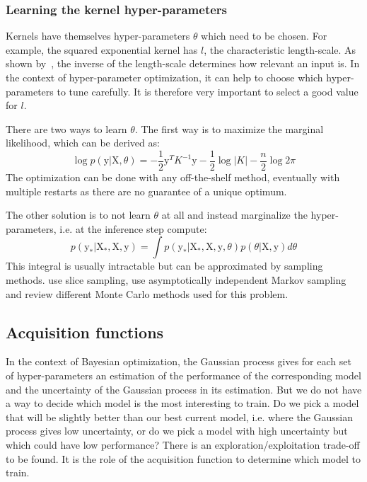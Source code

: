 \subsubsection{Learning the kernel hyper-parameters}

Kernels have themselves hyper-parameters $\theta$ which need to be chosen. For example, the squared exponential kernel has $l$, the characteristic length-scale. As shown by~\textcite{neal1996phd}, the inverse of the length-scale determines how relevant an input is. In the context of hyper-parameter optimization, it can help to choose which hyper-parameters to tune carefully. It is therefore very important to select a good value for $l$. 

There are two ways to learn $\theta$. The first way is to maximize the marginal likelihood, which can be derived as:  
\begin{equation}
	\log p\left(\mathrm{y} | \mathrm{X}, \theta \right) = - \frac{1}{2} \mathrm{y}^T K^{-1} \mathrm{y} - \frac{1}{2} \log |K| - \frac{n}{2} \log 2 \pi
\end{equation}
The optimization can be done with any off-the-shelf method, eventually with multiple restarts as there are no guarantee of a unique optimum. 

The other solution is to not learn $\theta$ at all and instead marginalize the hyper-parameters, i.e. at the inference step compute:
\begin{equation}
    p\left( \mathrm{y_*} | \mathrm{X_*}, \mathrm{X}, \mathrm{y} \right)
    = \int p\left( \mathrm{y_*} | \mathrm{X_*}, \mathrm{X}, \mathrm{y}, \theta \right) p \left( \theta | \mathrm{X}, \mathrm{y} \right) d\theta
\end{equation}
This integral is usually intractable but can be approximated by sampling methods. \textcite{murray2010NIPS} use slice sampling, \textcite{garbuno2016CSDA} use asymptotically independent Markov sampling and \textcite{titsias2011} review different Monte Carlo methods used for this problem.

\subsection{Acquisition functions}
\label{ssec:acqfunc}

In the context of Bayesian optimization, the Gaussian process gives for each set of hyper-parameters an estimation of the performance of the corresponding model and the uncertainty of the Gaussian process in its estimation. But we do not have a way to decide which model is the most interesting to train. Do we pick a model that will be slightly better than our best current model, i.e. where the Gaussian process gives low uncertainty, or do we pick a model with high uncertainty but which could have low performance? There is an exploration/exploitation trade-off to be found. It is the role of the acquisition function to determine which model to train.

